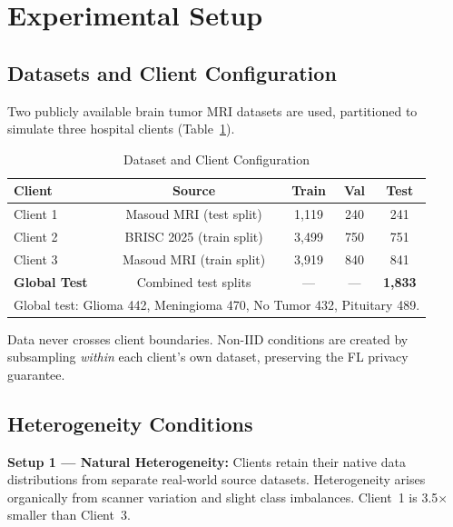 \documentclass[conference]{IEEEtran}
\begin{document}
\section{Experimental Setup}
\label{sec:setup}

\subsection{Datasets and Client Configuration}
Two publicly available brain tumor MRI datasets are used, partitioned to
simulate three hospital clients (Table~\ref{tab:clients}).

\begin{table}[t]
\caption{Dataset and Client Configuration}
\label{tab:clients}
\begin{center}
\begin{tabular}{lcccc}
\hline
\textbf{Client} & \textbf{Source} & \textbf{Train} & \textbf{Val} &
\textbf{Test}\\
\hline
Client 1 & Masoud MRI \cite{masoud} (test split) & 1,119 & 240 & 241\\
Client 2 & BRISC 2025 \cite{brisc} (train split) & 3,499 & 750 & 751\\
Client 3 & Masoud MRI \cite{masoud} (train split) & 3,919 & 840 & 841\\
\hline
\textbf{Global Test} & Combined test splits & --- & --- & \textbf{1,833}\\
\hline
\multicolumn{5}{l}{\small Global test: Glioma 442, Meningioma 470, No Tumor
432, Pituitary 489.}
\end{tabular}
\end{center}
\end{table}

Data never crosses client boundaries. Non-IID conditions are created by
subsampling \emph{within} each client's own dataset, preserving the FL privacy
guarantee.

\subsection{Heterogeneity Conditions}

\textbf{Setup 1 --- Natural Heterogeneity:} Clients retain their native data
distributions from separate real-world source datasets. Heterogeneity arises
organically from scanner variation and slight class imbalances. Client~1 is
3.5$\times$ smaller than Client~3.
\end{document}
